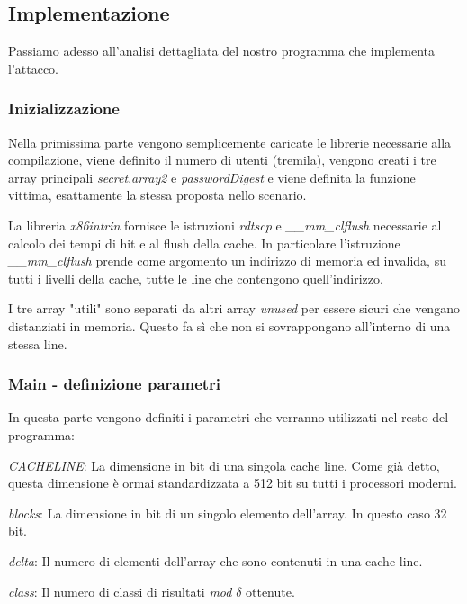 			\subsection{Implementazione}
				Passiamo adesso all'analisi dettagliata del nostro programma che implementa l'attacco.
				
				\subsubsection{Inizializzazione}
				
				Nella primissima parte vengono semplicemente caricate le librerie necessarie alla compilazione, viene definito il numero di utenti (tremila), vengono creati i tre array principali \emph{secret},\emph{array2} e \emph{passwordDigest} e viene definita la funzione vittima, esattamente la stessa proposta nello scenario.
				
 				La libreria \emph{x86intrin} fornisce le istruzioni \emph{rdtscp} e \emph{\_\_mm\_clflush} necessarie al calcolo dei tempi di hit e al flush della cache. In particolare l'istruzione \emph{\_\_mm\_clflush} prende come argomento un indirizzo di memoria ed invalida, su tutti i livelli della cache, tutte le line che contengono quell'indirizzo.
				
				I tre array "utili" sono separati da altri array \emph{unused} per essere sicuri che vengano distanziati in memoria. Questo fa sì che non si sovrappongano all'interno di una stessa line.
				
				\subsubsection{Main - definizione parametri}
				
				In questa parte vengono definiti i parametri che verranno utilizzati nel resto del programma:

					\emph{CACHELINE}: La dimensione in bit di una singola cache line. Come già detto, questa dimensione è ormai standardizzata a 512 bit su tutti i processori moderni.
					
					\emph{blocks}: La dimensione in bit di un singolo elemento dell'array. In questo caso 32 bit.
					
					\emph{delta}: Il numero di elementi dell'array che sono contenuti in una cache line.
					
					\emph{class}: Il numero di classi di risultati \emph{mod} $\delta$ ottenute.
					
